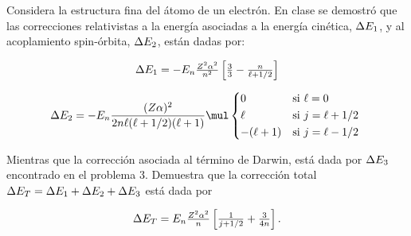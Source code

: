 \documentclass[./../main.tex]{subfiles}
\begin{document}
	\color{blue}
	\begin{exercise}
		Considera la estructura fina del átomo de un electrón. En clase se demostró que las correcciones relativistas a la energía asociadas a la energía cinética, \(\change{E_{1}}\), y al acoplamiento spin-órbita, \(\change{E_{2}}\), están dadas por:

		\begin{equation*}
			\change{E_{1}} = -E_{n}\tfrac{Z^{2}\alpha^{2}}{n^{2}}\left[\tfrac{3}{3} - \tfrac{n}{\ell + 1/2}\right]
		\end{equation*}

		\begin{equation*}
			\change{E_{2}} = -E_{n}\dfrac{(Z\alpha)^{2}}{2n\ell(\ell + 1/2)(\ell + 1)} \mul
			\begin{cases*}
				0 & si \(\ell = 0\)\\
				\ell & si \(j = \ell + 1/2\)\\
				-(\ell + 1) & si \(j = \ell - 1/2\)
			\end{cases*}
		\end{equation*}

		Mientras que la corrección asociada al término de Darwin, está dada por \(\change{E_{3}}\) encontrado en el problema 3. Demuestra que la corrección total \(\change{E_{T}} = \change{E_{1}} + \change{E_{2}} + \change{E_{3}}\) está dada por

		\begin{equation*}
			\change{E_{T}} = E_{n}\tfrac{Z^{2}\alpha^{2}}{n}\left[\tfrac{1}{j + 1/2} + \tfrac{3}{4n}\right].
		\end{equation*}
	\end{exercise}
\end{document}
